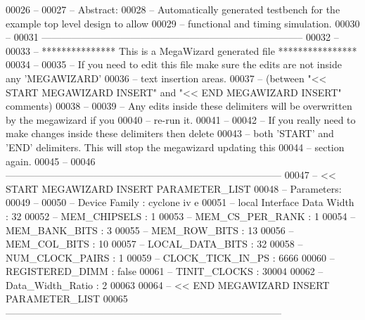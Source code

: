 \begin{DoxyCode}
00026 \textcolor{keyword}{--}
00027 \textcolor{keyword}{-- Abstract:}
00028 \textcolor{keyword}{-- Automatically generated testbench for the example top level design to allow}
00029 \textcolor{keyword}{-- functional and timing simulation.}
00030 \textcolor{keyword}{--}
00031 \textcolor{keyword}{--------------------------------------------------------------------------------}
00032 \textcolor{keyword}{--}
00033 \textcolor{keyword}{-- *************** This is a MegaWizard generated file ****************}
00034 \textcolor{keyword}{--}
00035 \textcolor{keyword}{-- If you need to edit this file make sure the edits are not inside any 'MEGAWIZARD'}
00036 \textcolor{keyword}{-- text insertion areas.}
00037 \textcolor{keyword}{-- (between "<< START MEGAWIZARD INSERT" and "<< END MEGAWIZARD INSERT" comments)}
00038 \textcolor{keyword}{--}
00039 \textcolor{keyword}{-- Any edits inside these delimiters will be overwritten by the megawizard if you}
00040 \textcolor{keyword}{-- re-run it.}
00041 \textcolor{keyword}{--}
00042 \textcolor{keyword}{-- If you really need to make changes inside these delimiters then delete}
00043 \textcolor{keyword}{-- both 'START' and 'END' delimiters.  This will stop the megawizard updating this}
00044 \textcolor{keyword}{-- section again.}
00045 \textcolor{keyword}{--}
00046 \textcolor{keyword}{------------------------------------------------------------------------------------}
00047 \textcolor{keyword}{-- << START MEGAWIZARD INSERT PARAMETER\_LIST}
00048 \textcolor{keyword}{-- Parameters:}
00049 \textcolor{keyword}{--}
00050 \textcolor{keyword}{-- Device Family                      : cyclone iv e}
00051 \textcolor{keyword}{-- local Interface Data Width         : 32}
00052 \textcolor{keyword}{-- MEM\_CHIPSELS                       : 1}
00053 \textcolor{keyword}{-- MEM\_CS\_PER\_RANK                    : 1}
00054 \textcolor{keyword}{-- MEM\_BANK\_BITS                      : 3}
00055 \textcolor{keyword}{-- MEM\_ROW\_BITS                       : 13}
00056 \textcolor{keyword}{-- MEM\_COL\_BITS                       : 10}
00057 \textcolor{keyword}{-- LOCAL\_DATA\_BITS                    : 32}
00058 \textcolor{keyword}{-- NUM\_CLOCK\_PAIRS                    : 1}
00059 \textcolor{keyword}{-- CLOCK\_TICK\_IN\_PS                   : 6666}
00060 \textcolor{keyword}{-- REGISTERED\_DIMM                    : false}
00061 \textcolor{keyword}{-- TINIT\_CLOCKS                       : 30004}
00062 \textcolor{keyword}{-- Data\_Width\_Ratio                   : 2}
00063 
00064 \textcolor{keyword}{-- << END MEGAWIZARD INSERT PARAMETER\_LIST}
00065 \textcolor{keyword}{------------------------------------------------------------------------------------}

\end{DoxyCode}
